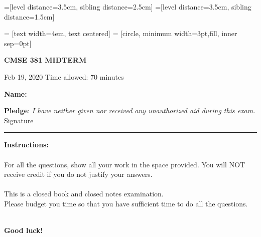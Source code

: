 \documentclass[11pt,letter]{exam}
\begin{document}
=[level distance=3.5cm, sibling distance=2.5cm]
=[level distance=3.5cm, sibling distance=1.5cm]

 = [text width=4em, text centered]
 = [circle, minimum width=3pt,fill, inner sep=0pt]

\CorrectChoiceEmphasis{\color{red}\bfseries}
\bracketedpoints
{}
\setlength\answerskip{0.05ex}

\begin{center}
{\Large {\bf CMSE 381  MIDTERM} }
\end{center}
\vspace{1cm}

Feb 19, 2020 \hfill Time allowed: 70 minutes \vspace{1 cm}

{\bf Name: \underline {\hspace{2in}}} \hspace{1cm}

\vspace*{0.7in}

{\bf Pledge}: {\it I have neither given nor received any unauthorized aid during this exam.}
\vspace*{1.25cm}\\
Signature \rule{5cm}{.5mm}\vspace*{0.7in}

{\bf Instructions:}\\
\vspace*{.1in}
\\
For all the questions, show all your work in the space provided. You will NOT receive credit if you do not justify your answers. \\
\vspace*{.1in}\\
This is a closed book and closed notes examination.
\vspace*{.1in}\\
Please budget you time so that you have sufficient time to do all the  questions.


\mbox{}

\makebox[5.5in]{\hrulefill}\\



\vspace*{0.2in}
 {\bf Good luck!}
\newpage

\end{document}
